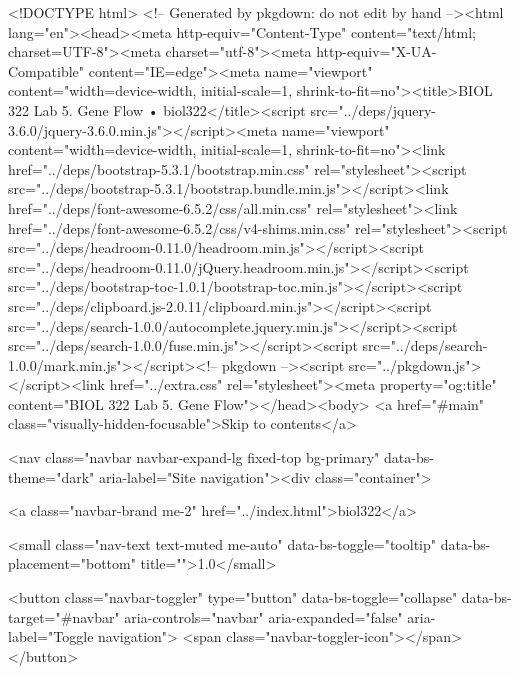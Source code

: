 <!DOCTYPE html>
<!-- Generated by pkgdown: do not edit by hand --><html lang="en"><head><meta http-equiv="Content-Type" content="text/html; charset=UTF-8"><meta charset="utf-8"><meta http-equiv="X-UA-Compatible" content="IE=edge"><meta name="viewport" content="width=device-width, initial-scale=1, shrink-to-fit=no"><title>BIOL 322 Lab 5. Gene Flow • biol322</title><script src="../deps/jquery-3.6.0/jquery-3.6.0.min.js"></script><meta name="viewport" content="width=device-width, initial-scale=1, shrink-to-fit=no"><link href="../deps/bootstrap-5.3.1/bootstrap.min.css" rel="stylesheet"><script src="../deps/bootstrap-5.3.1/bootstrap.bundle.min.js"></script><link href="../deps/font-awesome-6.5.2/css/all.min.css" rel="stylesheet"><link href="../deps/font-awesome-6.5.2/css/v4-shims.min.css" rel="stylesheet"><script src="../deps/headroom-0.11.0/headroom.min.js"></script><script src="../deps/headroom-0.11.0/jQuery.headroom.min.js"></script><script src="../deps/bootstrap-toc-1.0.1/bootstrap-toc.min.js"></script><script src="../deps/clipboard.js-2.0.11/clipboard.min.js"></script><script src="../deps/search-1.0.0/autocomplete.jquery.min.js"></script><script src="../deps/search-1.0.0/fuse.min.js"></script><script src="../deps/search-1.0.0/mark.min.js"></script><!-- pkgdown --><script src="../pkgdown.js"></script><link href="../extra.css" rel="stylesheet"><meta property="og:title" content="BIOL 322 Lab 5. Gene Flow"></head><body>
    <a href="#main" class="visually-hidden-focusable">Skip to contents</a>


    <nav class="navbar navbar-expand-lg fixed-top bg-primary" data-bs-theme="dark" aria-label="Site navigation"><div class="container">

    <a class="navbar-brand me-2" href="../index.html">biol322</a>

    <small class="nav-text text-muted me-auto" data-bs-toggle="tooltip" data-bs-placement="bottom" title="">1.0</small>


    <button class="navbar-toggler" type="button" data-bs-toggle="collapse" data-bs-target="#navbar" aria-controls="navbar" aria-expanded="false" aria-label="Toggle navigation">
      <span class="navbar-toggler-icon"></span>
    </button>

